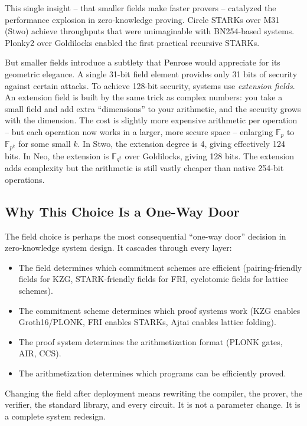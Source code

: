 \documentclass[
  11pt,
  openany]{report}
\providecommand{\tightlist}{%
  \setlength{\itemsep}{0pt}\setlength{\parskip}{0pt}}
\begin{document}
This single insight -- that smaller fields make faster provers -- catalyzed the
performance explosion in zero-knowledge proving. Circle STARKs over M31 (Stwo)
achieve throughputs that were unimaginable with BN254-based systems. Plonky2
over Goldilocks enabled the first practical recursive STARKs.

But smaller fields introduce a subtlety that Penrose would appreciate for its
geometric elegance. A single 31-bit field element provides only 31 bits of
security against certain attacks. To achieve 128-bit security, systems use
\emph{extension fields}. An extension field is built by the same trick as
complex numbers: you take a small field and add extra ``dimensions'' to your
arithmetic, and the security grows with the dimension. The cost is slightly more
expensive arithmetic per operation -- but each operation now works in a larger,
more secure space -- enlarging \(\mathbb{F}_p\) to \(\mathbb{F}_{p^k}\) for some
small \(k\). In Stwo, the extension degree is 4, giving effectively 124 bits. In
Neo, the extension is \(\mathbb{F}_{q^2}\) over Goldilocks, giving 128 bits. The
extension adds complexity but the arithmetic is still vastly cheaper than native
254-bit operations.

\subsection{Why This Choice Is a One-Way
Door}\label{why-this-choice-is-a-one-way-door}

The field choice is perhaps the most consequential ``one-way door'' decision in
zero-knowledge system design. It cascades through every layer:

\begin{itemize}
\tightlist
\item
  The field determines which commitment schemes are efficient (pairing-friendly
  fields for KZG, STARK-friendly fields for FRI, cyclotomic fields for lattice
  schemes).
\item
  The commitment scheme determines which proof systems work (KZG enables
  Groth16/PLONK, FRI enables STARKs, Ajtai enables lattice folding).
\item
  The proof system determines the arithmetization format (PLONK gates, AIR,
  CCS).
\item
  The arithmetization determines which programs can be efficiently proved.
\end{itemize}

Changing the field after deployment means rewriting the compiler, the prover,
the verifier, the standard library, and every circuit. It is not a parameter
change. It is a complete system redesign.
\end{document}

